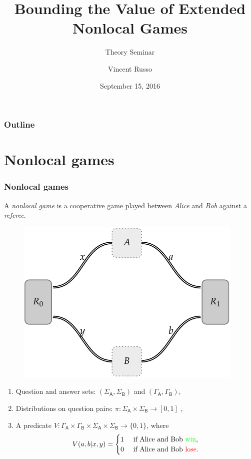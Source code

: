 \documentclass{beamer}
\title{Bounding the Value of Extended Nonlocal Games}
\subtitle{Theory Seminar}
\author[V. Russo]{Vincent Russo}
\institute[UWaterloo]{University of Waterloo}
\date{September 15, 2016}
\def \GammaA{\Gamma_{\reg{A}}}
\def \GammaB{\Gamma_{\reg{B}}}
\def \SigmaA{\Sigma_{\reg{A}}}
\def \SigmaB{\Sigma_{\reg{B}}}
\newcommand{\reg}[1]{\mathsf{#1}}
\begin{document}
  {%
    \frame{\titlepage}
  }

  \beamertemplatenavigationsymbolsempty

  \begin{frame}
    \frametitle{Outline}
    \tableofcontents%
  \end{frame}

  \section{Nonlocal games}

\begin{frame}
	\frametitle{Nonlocal games}
	A \emph{nonlocal game} is a cooperative game played between \emph{Alice} and \emph{Bob} against a \emph{referee}. 
	\begin{figure}[!htpb] \label{fig:nonlocal-game}
	\begin{center}
		\includegraphics[scale=0.8]{figures/two_player_game.pdf}
	\end{center}
\end{figure}
	\begin{enumerate}
		\item Question and answer sets: $(\SigmaA, \SigmaB)$ and $(\GammaA, \GammaB)$,
		\item Distributions on question pairs: $\pi: \SigmaA \times \SigmaB \rightarrow [0,1]$ ,
		\item A predicate $V : \GammaA \times \GammaB \times \SigmaA \times \SigmaB \rightarrow \{0,1\}$, where 
\[
 V(a,b|x,y) =
  \begin{cases} 
      \hfill 1 \hfill & \text{ if Alice and Bob \textcolor{green}{win}}, \\
      \hfill 0 \hfill & \text{ if Alice and Bob \textcolor{red}{lose}}. \\
  \end{cases}
\]			
	\end{enumerate}
\end{frame}
\end{document}
